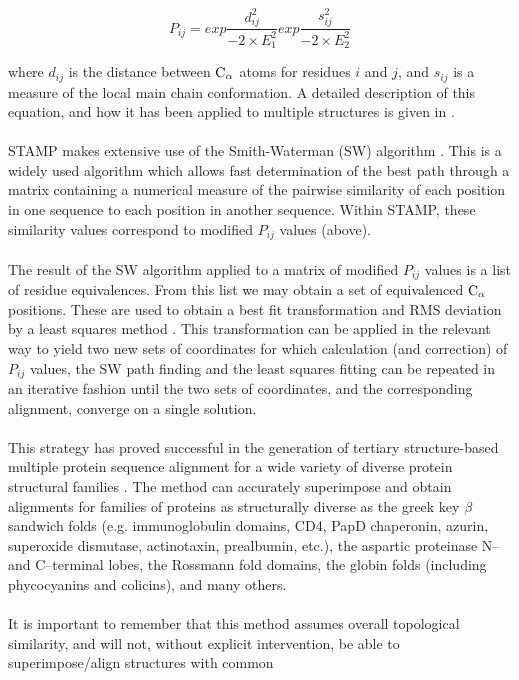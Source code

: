\[
P_{ij} = exp \frac{d_{ij}^{2}}{-2 \times E_{1}^{2}} 
exp \frac{s_{ij}^{2}}{-2 \times E_{2}^{2}} 
\]

where $d_{ij}$ is the distance between ${\rm C}_{\alpha}$ atoms for residues $i$
and $j$, and $s_{ij}$ is a measure of the local main chain conformation.
A detailed description of this equation, and how it has been
applied to multiple structures is given in \cite{rb92b}. \\
\\
STAMP makes extensive use of the Smith-Waterman (SW) algorithm 
\cite{smith81,barton93b,timewarps}.  This is a widely used algorithm 
which allows fast determination of the best path through a matrix 
containing a numerical measure of the pairwise similarity of each 
position in one sequence to each position in another sequence.  Within 
STAMP, these similarity values correspond to modified $P_{ij}$ 
values (above).\\
\\
The result of the SW algorithm applied to a matrix of modified $P_{ij}$
values is a list of residue equivalences.  From this list
we may obtain a set of equivalenced ${\rm C}_{\alpha}$ positions.  These are
used to obtain a best fit transformation and RMS deviation by a
least squares method \cite{kabsch78,mclachlan79}.  This
transformation can be applied in the relevant way to yield two
new sets of coordinates for which calculation (and correction) of
$P_{ij}$ values, the SW path finding and the least squares fitting can
be repeated in an iterative fashion until the two sets of
coordinates, and the corresponding alignment, converge on a
single solution.\\
\\
This strategy has proved successful in the generation of tertiary
structure-based multiple protein sequence alignment for a wide
variety of diverse protein structural families 
\cite{rb92b,rb93b,rb93c,rb94,russell94}.  
The method can accurately superimpose and obtain alignments for families 
of proteins as structurally diverse as the greek key $\beta$ sandwich 
folds (e.g. immunoglobulin domains, CD4, PapD chaperonin, 
azurin, superoxide dismutase, actinotaxin, prealbumin, etc.), the
aspartic proteinase N-- and C--terminal lobes, the Rossmann
fold domains, the globin folds (including phycocyanins and
colicins), and many others.\\
\\
It is important to remember that this method assumes overall
topological similarity, and will not, without explicit
intervention,  be able to superimpose/align structures with common
